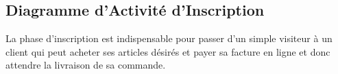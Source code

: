 \subsection{Diagramme d'Activité d'Inscription}

La phase d'inscription est indispensable pour passer d'un simple visiteur à un client qui peut acheter ses articles désirés et payer sa facture en ligne et donc attendre la livraison de sa commande.